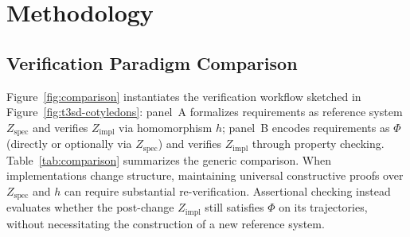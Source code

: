 \section{Methodology} \label{sec:methodology}

\subsection{Verification Paradigm Comparison}
Figure~\ref{fig:comparison} instantiates the verification workflow sketched in Figure~\ref{fig:t3sd-cotyledons}: panel~A formalizes requirements as reference system $Z_{\text{spec}}$ and verifies $Z_{\text{impl}}$ via homomorphism $h$; panel~B encodes requirements as $\Phi$ (directly or optionally via $Z_{\text{spec}}$) and verifies $Z_{\text{impl}}$ through property checking. Table~\ref{tab:comparison} summarizes the generic comparison.  When implementations change structure, maintaining universal constructive proofs over $Z_{\text{spec}}$ and $h$ can require substantial re-verification. Assertional checking instead evaluates whether the post-change $Z_{\text{impl}}$ still satisfies $\Phi$ on its trajectories, without necessitating the construction of a new reference system.

